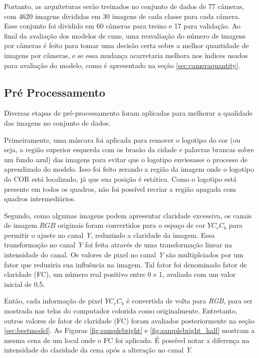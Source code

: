 Portanto, as arquiteturas serão treinados no conjunto de dados de 77 câmeras, com 4620 imagens divididas em 30 imagens de cada classe para cada câmera.
Esse conjunto foi dividido em 60 câmeras para treino e 17 para validação.
Ao final da avaliação dos modelos de \acrshort{cnn}s, uma reavaliação do número de imagens por câmeras é feito para tomar uma decisão certa sobre a melhor quantidade de imagens por câmeras, 
e se essa mudança acarretaria melhora nos índices usados para avaliação do modelo, como é apresentado na seção \ref{sec:cameraquantity}.
\subsection{Pré Processamento}\label{subsec:datapreprocessing}

Diversas etapas de pré-processamento foram aplicadas para melhorar a qualidade das imagens no conjunto de dados.

Primeiramente, uma máscara foi aplicada para remover o logotipo do \acrshort{cor} (ou seja, a região superior esquerda com os brasão da cidade e palavras brancas sobre um fundo azul) das imagens para evitar que o logotipo enviesasse o processo de aprendizado do modelo. 
Isso foi feito zerando a região da imagem onde o logotipo do COR está localizado, já que sua posição é estática. 
Como o logotipo está presente em todos os quadros, não foi possível recriar a região apagada com quadros intermediários.

Segundo, como algumas imagens podem apresentar claridade excessiva, os canais de imagem $RGB$ originais foram convertidos para o espaço de cor $YC_rC_b$ para permitir o ajuste no canal \textit{Y}, 
reduzindo a claridade da imagem. 
Essa transformação no canal \textit{Y} foi feita através de uma transformação linear na intensidade do canal. 
Os valores de pixel no canal \textit{Y} são multiplciados por um fator que reduziria sua influência na imagem.
Tal fator foi denominado fator de claridade (FC), um número real positivo entre 0 e 1, avaliado com um valor inicial de 0,5. 

Então, cada informação de pixel $YC_rC_b$ é convertida de volta para  \textit{RGB}, para ser mostrada nas telas do computador colorida como originalmente. 
Entretanto, outros valores de fator de claridade (FC) foram avaliados posteriormente na seção \ref{sec:bestmodel}.
As Figuras \ref{fig:samplebright} e \ref{fig:samplebright_half} mostram a mesma cena de um local onde o FC foi aplicado. 
É possível notar a diferença na intensidade do claridade da cena após a alteração no canal \textit{Y}.

